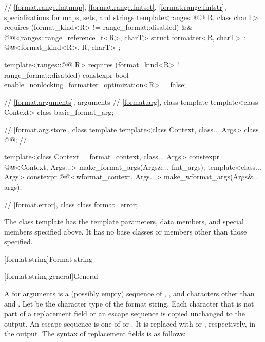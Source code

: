 \begin{codeblock}
{  // \ref{format.range.fmtmap}, \ref{format.range.fmtset}, \ref{format.range.fmtstr}, specializations for maps, sets, and strings
  template<ranges::@@ R, class charT>
    requires (format_kind<R> != range_format::disabled) &&
             @@<ranges::range_reference_t<R>, charT>
  struct formatter<R, charT> : @@<format_kind<R>, R, charT> { };

  template<ranges::@@ R>
    requires (format_kind<R> != range_format::disabled)
    constexpr bool enable_nonlocking_formatter_optimization<R> = false;

  // \ref{format.arguments}, arguments
  // \ref{format.arg}, class template 
  template<class Context> class basic_format_arg;

  // \ref{format.arg.store}, class template 
  template<class Context, class... Args> class @@;        // \expos

  template<class Context = format_context, class... Args>
    constexpr @@<Context, Args...>
      make_format_args(Args&... fmt_args);
  template<class... Args>
    constexpr @@<wformat_context, Args...>
      make_wformat_args(Args&... args);

  // \ref{format.error}, class 
  class format_error;
}
\end{codeblock}


\pnum
The class template 
has the template parameters, data members, and special members specified above. It has no base classes or members other than those specified.

[format.string]{Format string}

[format.string.general]{General}

\pnum
A  for arguments  is
a (possibly empty) sequence of
,
,
and characters other than \tcode{\{} and \tcode{\}}.
Let  be the character type of the format string.
Each character that is not part of
a replacement field or an escape sequence
is copied unchanged to the output.
An escape sequence is one of \tcode{\{\{} or \tcode{\}\}}.
It is replaced with \tcode{\{} or \tcode{\}}, respectively, in the output.
The syntax of replacement fields is as follows:

